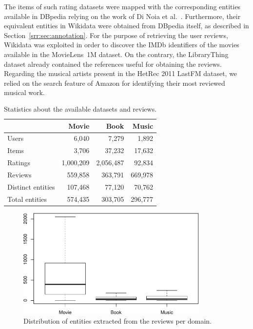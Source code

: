 The items of such rating datasets were mapped with the corresponding entities available in DBpedia relying on the work of Di Noia et al.~\cite{DiNoia2016}. Furthermore, their equivalent entities in Wikidata were obtained from DBpedia itself, as described in Section~\ref{srr:sec:annotation}. For the purpose of retrieving the user reviews, Wikidata was exploited in order to discover the IMDb identifiers of the movies available in the MovieLens~1M dataset. On the contrary, the LibraryThing dataset already contained the references useful for obtaining the reviews. Regarding the musical artists present in the HetRec 2011 LastFM dataset, we relied on the search feature of Amazon for identifying their most reviewed musical work.

\begin{table}
\centering
\begin{tabular}{@{}lrrr@{}}
\toprule
                   & Movie     & Book         & Music   \\ \midrule
Users              & 6,040     & 7,279        & 1,892   \\
Items              & 3,706     & 37,232       & 17,632  \\
Ratings            & 1,000,209 & 2,056,487    & 92,834  \\
Reviews            & 559,858   & 363,791      & 669,978 \\
Distinct entities  & 107,468   & 77,120       & 70,762  \\
Total entities     & 574,435   & 303,705      & 296,777 \\ \bottomrule
\end{tabular}
\caption[Statistics about datasets and reviews]{Statistics about the available datasets and reviews.}
\label{srr:tab:stats}
\end{table}

\begin{figure}
\centering
\includegraphics[width=0.85\textwidth]{boxplot}
\caption[Entities extracted from the reviews]{Distribution of entities extracted from the reviews per domain.}
\label{srr:fig:boxplot}
\end{figure}

